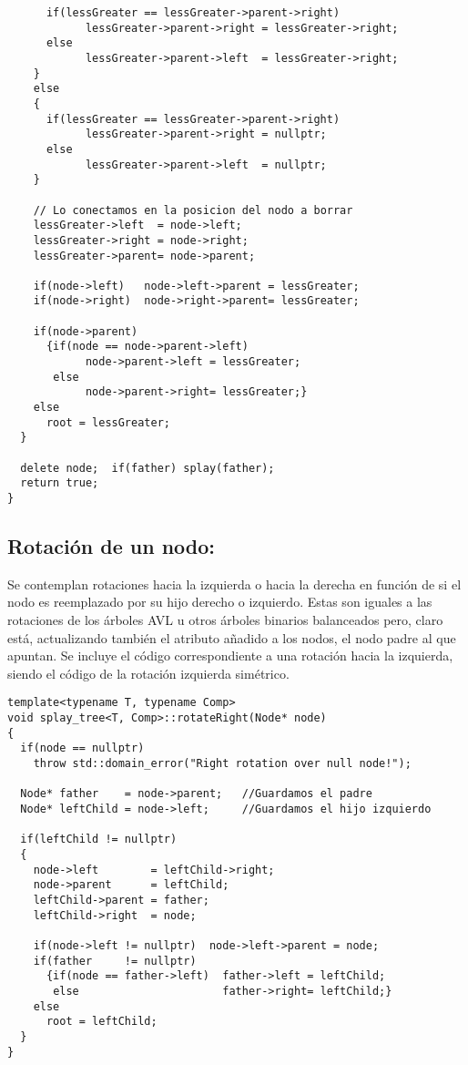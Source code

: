 \documentclass[letterpaper,12pt]{article}
\begin{document}
\begin{lstlisting}
      if(lessGreater == lessGreater->parent->right) 
            lessGreater->parent->right = lessGreater->right;
      else                                          
            lessGreater->parent->left  = lessGreater->right;
    }
    else
    {
      if(lessGreater == lessGreater->parent->right)  
            lessGreater->parent->right = nullptr;
      else  
            lessGreater->parent->left  = nullptr;
    }

    // Lo conectamos en la posicion del nodo a borrar
    lessGreater->left  = node->left;   
    lessGreater->right = node->right;  
    lessGreater->parent= node->parent;
    
    if(node->left)   node->left->parent = lessGreater;
    if(node->right)  node->right->parent= lessGreater;
    
    if(node->parent)
      {if(node == node->parent->left) 
            node->parent->left = lessGreater;
       else                           
            node->parent->right= lessGreater;}
    else
      root = lessGreater;
  }

  delete node;  if(father) splay(father);
  return true;
}
\end{lstlisting}
\subsection{Rotación de un nodo:}

Se contemplan rotaciones hacia la izquierda o hacia la derecha en función
de si el nodo es reemplazado por su hijo derecho o izquierdo. Estas son 
iguales a las rotaciones de los árboles AVL u otros árboles binarios 
balanceados pero, claro está, actualizando también el atributo añadido a los
nodos, el nodo padre al que apuntan. Se incluye el código correspondiente a 
una rotación hacia la izquierda, siendo el código de la rotación izquierda
simétrico.

\begin{lstlisting}
template<typename T, typename Comp>
void splay_tree<T, Comp>::rotateRight(Node* node)
{
  if(node == nullptr)
    throw std::domain_error("Right rotation over null node!");

  Node* father    = node->parent;   //Guardamos el padre
  Node* leftChild = node->left;     //Guardamos el hijo izquierdo

  if(leftChild != nullptr)
  {
    node->left        = leftChild->right;
    node->parent      = leftChild;
    leftChild->parent = father;
    leftChild->right  = node;

    if(node->left != nullptr)  node->left->parent = node;
    if(father     != nullptr)
      {if(node == father->left)  father->left = leftChild;
       else                      father->right= leftChild;}
    else
      root = leftChild;
  }
}
\end{lstlisting}
\end{document}
